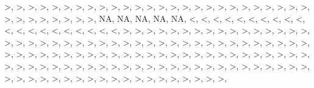 \documentclass[12pt,]{article}
\begin{document}
\textgreater{}, \textgreater{}, \textgreater{}, \textgreater{},
\textgreater{}, \textgreater{}, \textgreater{}, \textgreater{},
\textgreater{}, \textgreater{}, \textgreater{}, \textgreater{},
\textgreater{}, \textgreater{}, \textgreater{}, \textgreater{},
\textgreater{}, \textgreater{}, \textgreater{}, \textgreater{},
\textgreater{}, \textgreater{}, \textgreater{}, \textgreater{},
\textgreater{}, \textgreater{}, \textgreater{}, \textgreater{},
\textgreater{}, \textgreater{}, \textgreater{}, \textgreater{},
\textgreater{}, \textgreater{}, NA, NA, NA, NA, NA, \textless{},
\textless{}, \textless{}, \textless{}, \textless{}, \textless{},
\textless{}, \textless{}, \textless{}, \textless{}, \textless{},
\textless{}, \textless{}, \textless{}, \textless{}, \textless{},
\textless{}, \textless{}, \textless{}, \textless{}, \textgreater{},
\textgreater{}, \textgreater{}, \textgreater{}, \textgreater{},
\textgreater{}, \textgreater{}, \textgreater{}, \textgreater{},
\textgreater{}, \textgreater{}, \textgreater{}, \textgreater{},
\textgreater{}, \textgreater{}, \textgreater{}, \textgreater{},
\textgreater{}, \textgreater{}, \textgreater{}, \textgreater{},
\textgreater{}, \textgreater{}, \textgreater{}, \textgreater{},
\textgreater{}, \textgreater{}, \textgreater{}, \textgreater{},
\textgreater{}, \textgreater{}, \textgreater{}, \textgreater{},
\textgreater{}, \textgreater{}, \textgreater{}, \textgreater{},
\textgreater{}, \textgreater{}, \textgreater{}, \textgreater{},
\textgreater{}, \textgreater{}, \textgreater{}, \textgreater{},
\textgreater{}, \textgreater{}, \textgreater{}, \textgreater{},
\textgreater{}, \textgreater{}, \textgreater{}, \textgreater{},
\textgreater{}, \textgreater{}, \textgreater{}, \textgreater{},
\textgreater{}, \textgreater{}, \textgreater{}, \textgreater{},
\textgreater{}, \textgreater{}, \textgreater{}, \textgreater{},
\textgreater{}, \textgreater{}, \textgreater{}, \textgreater{},
\textgreater{}, \textgreater{}, \textgreater{}, \textgreater{},
\textgreater{}, \textgreater{}, \textgreater{}, \textgreater{},
\textgreater{}, \textgreater{}, \textgreater{}, \textgreater{},
\textgreater{}, \textgreater{}, \textgreater{}, \textgreater{},
\textgreater{}, \textgreater{}, \textgreater{}, \textgreater{},
\textgreater{}, \textgreater{}, \textgreater{}, \textgreater{},
\textgreater{}, \textgreater{}, \textgreater{}, \textgreater{},
\textgreater{}, \textgreater{}, \textgreater{}, \textgreater{},
\textgreater{}, \textgreater{}, \textgreater{}, \textgreater{},
\textgreater{}, \textgreater{}, \textgreater{}, \textgreater{},
\textgreater{}, \textgreater{}, \textgreater{}, \textgreater{},
\end{document}
